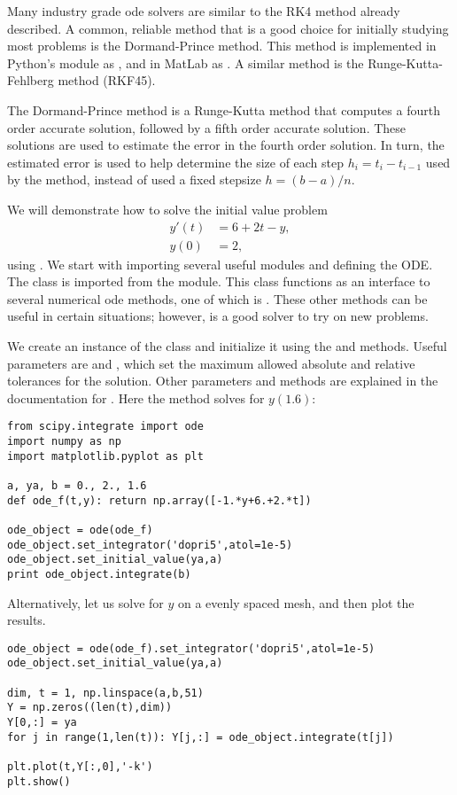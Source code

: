 \label{lab:ZombieApocalypse}

Many industry grade ode solvers are similar to the RK4 method already described. A common, reliable method that is a good choice for initially studying most problems is the Dormand-Prince method. This method is implemented in Python's  module as , and in MatLab as . A similar method is the Runge-Kutta-Fehlberg method (RKF45). 

The Dormand-Prince method is a Runge-Kutta method that computes a fourth order accurate solution, followed by a fifth order accurate solution. These solutions are used to estimate the error in the fourth order solution. In turn, the estimated error is used to help determine the size of each step $h_i = t_i-t_{i-1}$ used by the method, instead of used a fixed stepsize $h = (b-a)/n$. 

We will demonstrate how to solve the initial value problem
\begin{align*}
y'(t) &= 6+2t-y, \\
y(0) &= 2,
\end{align*}
using . We start with importing several useful modules and defining the ODE. 
The  class is imported from the  module. 
This class functions as an interface to several numerical ode methods, one of which is . 
These other methods can be useful in certain situations; however,  is a good solver to try on new problems. 

We create an instance of the  class and initialize it using the  and  methods. 
Useful parameters are  and , which set the maximum allowed absolute and relative tolerances for the solution. 
Other parameters and methods are explained in the documentation for .  
Here the method solves for $y(1.6)$:

\begin{lstlisting}
from scipy.integrate import ode
import numpy as np
import matplotlib.pyplot as plt

a, ya, b = 0., 2., 1.6
def ode_f(t,y): return np.array([-1.*y+6.+2.*t])

ode_object = ode(ode_f)
ode_object.set_integrator('dopri5',atol=1e-5) 
ode_object.set_initial_value(ya,a) 
print ode_object.integrate(b)
\end{lstlisting}

Alternatively, let us solve for $y$ on a evenly spaced mesh, and then plot the results.
\begin{lstlisting}
ode_object = ode(ode_f).set_integrator('dopri5',atol=1e-5) 
ode_object.set_initial_value(ya,a) 

dim, t = 1, np.linspace(a,b,51)
Y = np.zeros((len(t),dim))
Y[0,:] = ya
for j in range(1,len(t)): Y[j,:] = ode_object.integrate(t[j])  

plt.plot(t,Y[:,0],'-k')
plt.show()
\end{lstlisting}


